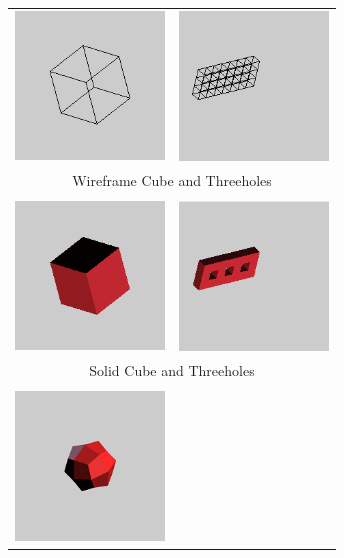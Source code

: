 \documentclass[12pt,a4paper]{scrartcl}
\begin{document}
	\begin{longtable}{cc}
		\includegraphics[width=150px, height=150px]{Images/cube-wireframe.png} 
		& \includegraphics[width=150px, height=150px]{Images/threeholes-wireframe.png}  \\
		\multicolumn{2}{c}{Wireframe Cube and Threeholes} \\
		&\\
		\includegraphics[width=150px, height=150px]{Images/cube-solid.png} 
		& \includegraphics[width=150px, height=150px]{Images/threeholes-solid.png}  \\
		\multicolumn{2}{c}{Solid Cube and Threeholes} \\
		&\\
		\includegraphics[width=150px, height=150px]{Images/cube-1sd.png} 

\end{longtable}
\end{document}
